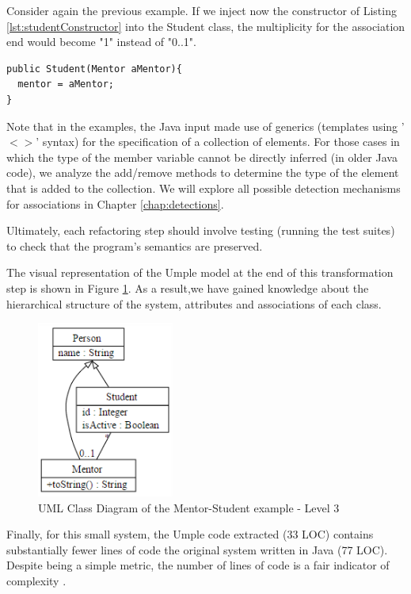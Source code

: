 Consider again the previous example.  If we inject now the constructor of Listing \ref{lst:studentConstructor} into the Student class, the multiplicity for the association end would become "1" instead of "0..1". 

\begin{lstlisting}[style=java,caption=A new constructor added to Student class,label=lst:studentConstructor]
public Student(Mentor aMentor){
  mentor = aMentor;
}
\end{lstlisting}

Note that in the examples, the Java input made use of generics (templates using '$<>$' syntax) for the specification of a collection of elements. For those cases in which the type of the member variable cannot be directly inferred (in older Java code), we analyze the add/remove methods to determine the type of the element that is added to the collection. We will explore all possible detection mechanisms for associations in Chapter \ref{chap:detections}.

Ultimately, each refactoring step should involve testing (running the test suites) to check that the program's semantics are preserved. 

The visual representation of the Umple model at the end of this transformation step is shown in Figure \ref{fig:Example1a3}. As a result,we have gained knowledge about the hierarchical structure of the system, attributes and associations of each class. 

\begin{figure}[h]
\centering
\includegraphics[width=0.40\textwidth]{Figures/Example1a3.png} 
\caption{UML Class Diagram of the Mentor-Student example - Level 3}
\label{fig:Example1a3}
\end{figure}

Finally, for this small system, the Umple code extracted (33 LOC) contains substantially fewer lines of code the original system written in Java (77 LOC). Despite being a simple metric, the number of lines of code is a fair indicator of complexity \cite{LOCMetric}. 

